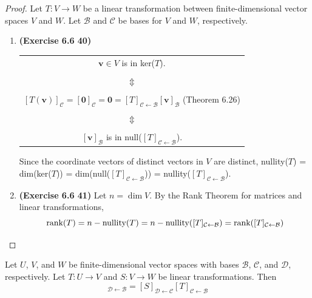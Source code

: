 \begin{proof}
	Let $T: V \rightarrow W$ be a linear transformation between finite-dimensional vector spaces $V$ and $W$. Let $\mathcal{B}$ and $\mathcal{C}$ be bases for $V$ and $W$, respectively.
	\begin{enumerate}
		\item \textbf{(Exercise 6.6 40)} \\
		\begin{table}[H]
			\begin{center}
				\begin{tabular}{c}
					$\textbf{v} \in V$ is in ker($T$). \\
					\\
					$\Updownarrow$ \\
					\\
					$[T(\textbf{v})]_\mathcal{C} = [\textbf{0}]_\mathcal{C} = \textbf{0} = [T]_{ \mathcal{C} \leftarrow \mathcal{B} }[\textbf{v}]_\mathcal{B}$ (Theorem 6.26) \\
					\\
					$\Updownarrow$ \\
					\\
					$[\textbf{v}]_\mathcal{B}$ is in null($[T]_{ \mathcal{C} \leftarrow \mathcal{B} }$).
				\end{tabular}
			\end{center}
		\end{table}
		Since the coordinate vectors of distinct vectors in $V$ are distinct, nullity($T$) = dim(ker($T$)) = dim(null($[T]_{ \mathcal{C} \leftarrow \mathcal{B}} $)) = nullity($[T]_{ \mathcal{C} \leftarrow \mathcal{B}}$).
		\item \textbf{(Exercise 6.6 41)} Let $n = \dim V$. By the Rank Theorem for matrices and linear transformations, \begin{equation*}
			\textnormal{rank}(T) = n - \textnormal{nullity}(T) = n - \textnormal{nullity}([T]_{ \mathcal{C} \leftarrow \mathcal{B} }) = \textnormal{rank}([T]_{ \mathcal{C} \leftarrow \mathcal{B}} )
		\end{equation*}
	\end{enumerate}
\end{proof}

\begin{theorem}
	Let $U$, $V$, and $W$ be finite-dimensional vector spaces with bases $\mathcal{B}$, $\mathcal{C}$, and $\mathcal{D}$, respectively. Let $T: U \rightarrow V$ and $S: V \rightarrow W$ be linear transformations. Then \begin{equation*}
		[S \circ T]_{\mathcal{D} \leftarrow \mathcal{B} } = [S]_{ \mathcal{D} \leftarrow \mathcal{C} }[T]_{ \mathcal{C} \leftarrow \mathcal{B} }
	\end{equation*}
\end{theorem}

